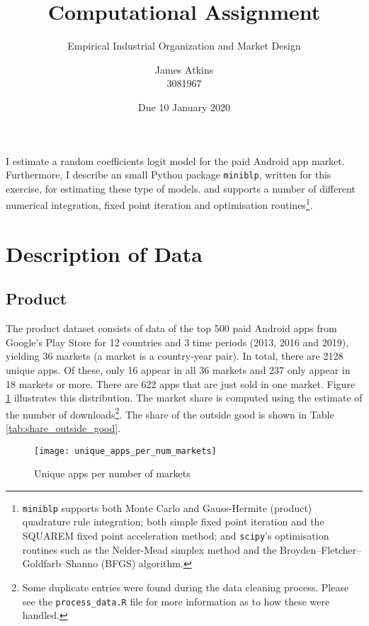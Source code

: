 \documentclass[parskip=half]{scrartcl}
\title{Computational Assignment}
\subtitle{Empirical Industrial Organization and Market Design}
\author{James Atkins \\ 3081967}
\date{Due 10 January 2020}
\newcommand{\code}[1]{\texttt{#1}}
\begin{document}
	
\maketitle

I estimate a random coefficients logit model for the paid Android app market. 
Furthermore, I describe an small Python package \code{miniblp}, written for this exercise, for estimating these type of models. and supports a number of different numerical integration, fixed point iteration and optimisation routines\footnote{\code{miniblp} supports both Monte Carlo and  Gauss-Hermite (product) quadrature rule integration; both simple fixed point iteration and the SQUAREM fixed point acceleration method; and \code{scipy}'s optimisation routines such as the Nelder-Mead simplex method and the Broyden–Fletcher–Goldfarb–Shanno (BFGS) algorithm.}.

\tableofcontents

\pagebreak
\section{Description of Data}

\subsection{Product}

The product dataset consists of data of the top 500 paid Android apps from Google's Play Store for 12 countries and 3 time periods (2013, 2016 and 2019), yielding 36 markets (a market is a country-year pair). In total, there are 2128 unique apps. Of these, only 16 appear in all 36 markets and 237 only appear in 18 markets or more. There are 622 apps that are just sold in one market. Figure \ref{fig:unique_apps_per_num_markets} illustrates this distribution. The market share is computed using the estimate of the number of downloads\footnote{Some duplicate entries were found during the data cleaning process. Please see the \code{process\_data.R} file for more information as to how these were handled.}. The share of the outside good is shown in Table \ref{tab:share_outside_good}.

\begin{figure}[ht]
	\centering
	\texttt{[image: unique\_apps\_per\_num\_markets]}
	\caption{Unique apps per number of markets}
	\label{fig:unique_apps_per_num_markets}
\end{figure}
\end{document}
